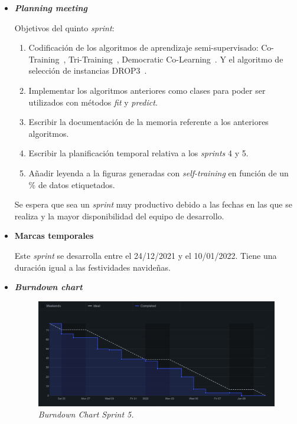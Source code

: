 \begin{itemize}
\item \textbf{\textit{Planning meeting}}

Objetivos del quinto \textit{sprint}:
\begin{enumerate}
\item Codificación de los algoritmos de aprendizaje semi-supervisado: Co-Training~\cite{blum1998combining}, Tri-Training~\cite{zhou2005tri}, Democratic Co-Learning~\cite{zhou2004democratic}. Y el algoritmo de selección de instancias DROP3~\cite{wilson2000reduction}.
\item Implementar los algoritmos anteriores como clases para poder ser utilizados con métodos \textit{fit} y \textit{predict}.
\item Escribir la documentación de la memoria referente a los anteriores algoritmos.
\item Escribir la planificación temporal relativa a los \textit{sprints} 4 y 5.
\item Añadir leyenda a la figuras generadas con \textit{self-training} en función de un \% de datos etiquetados.
\end{enumerate}
Se espera que sea un \textit{sprint} muy productivo debido a las fechas en las que se realiza y la mayor disponibilidad del equipo de desarrollo.
\item \textbf{Marcas temporales}

Este \textit{sprint} se desarrolla entre el 24/12/2021 y el 10/01/2022. Tiene una duración igual a las festividades navideñas.
\item \textbf{\textit{Burndown chart}}
\begin{figure}
\begin{center}
\includegraphics[width=\textwidth]{../img/anexos/sprints/BD-Sprint5}
\caption{\textit{Burndown Chart Sprint 5.}}\label{fig:BD-Sprint5}
\end{center}
\end{figure}


\end{itemize}
